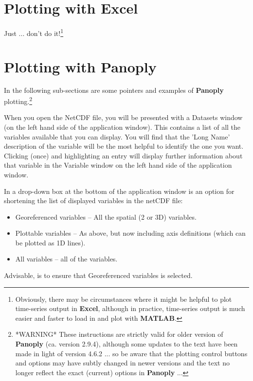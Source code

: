 \documentclass[11pt,fleqn]{book} %
\begin{document}

\newpage


\section{Plotting with Excel}

Just ... don't do it!\footnote{Obviously, there may be circumstances where it might be helpful to plot time-series output in \textbf{Excel}, although in practice, time-series output is much easier and faster to load in and plot with \textbf{MATLAB}.}


\newpage


\section{Plotting with Panoply}

In the following sub-sections are some pointers and examples of \textbf{Panoply} plotting.\footnote{*WARNING* These instructions are strictly valid for older version of \textbf{Panoply} (ca. version 2.9.4), although some updates to the text have been made in light of version 4.6.2 ... so be aware that the plotting control buttons and options may have subtly changed in newer versions and the text no longer reflect the exact (current) options in \textbf{Panoply} ...}
 
When you open the NetCDF file, you will be presented with a \footnotesize\textsf{Datasets }\normalsize window (on the left hand side of the application window). This contains a list of all the variables available that you can display. You will find that the 'Long Name' description of the variable will be the most helpful to identify the one you want. Clicking (once) and highlighting an entry will display further information about that variable in the \footnotesize\textsf{Variable }\normalsize window on the left hand side of the application window.

In a drop-down box at the bottom of the application window is an option for shortening the list of displayed variables in the netCDF file:

\begin{itemize}[noitemsep]
\item \footnotesize\textsf{Georeferenced variables }\normalsize -- All the spatial (2 or 3D) variables.
\item \footnotesize\textsf{Plottable variables }\normalsize -- As above, but now including axis definitions (which can be plotted as 1D lines).
\item \footnotesize\textsf{All variables }\normalsize -- all of the variables.
\end{itemize}
Advisable, is to ensure that \footnotesize\textsf{Georeferenced variables }\normalsize is selected.
\end{document}
